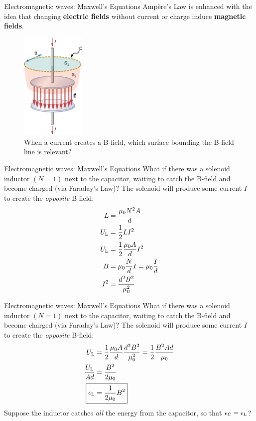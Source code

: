 \documentclass{beamer}
\begin{document}
\begin{frame}{Electromagnetic waves: Maxwell's Equations}
Amp\`{e}re's Law is enhanced with the idea that changing \textbf{electric fields} without current or charge induce \textbf{magnetic fields}.
\begin{figure}
\centering
\includegraphics[width=0.275\textwidth]{figures/displacement_current.png}
\caption{\label{fig:disp_current2} When a current creates a B-field, which surface bounding the B-field line is relevant?}
\end{figure}
\end{frame}

\begin{frame}{Electromagnetic waves: Maxwell's Equations}
What if there was a solenoid inductor $(N = 1)$ next to the capacitor, waiting to catch the B-field and become charged (via Faraday's Law)?  The solenoid will produce some current $I$ to create the \textit{opposite} B-field:
\begin{align}
L &= \frac{\mu_0 N^2 A}{d} \\
U_{\rm L} &= \frac{1}{2} L I^2 \\
U_{\rm L} &= \frac{1}{2} \frac{\mu_0 A}{d} I^2 \\
B &= \mu_0 \frac{N}{d} I = \mu_0 \frac{I}{d} \\
I^2 &= \frac{d^2B^2}{\mu_0^2}
\end{align}
\end{frame}

\begin{frame}{Electromagnetic waves: Maxwell's Equations}
What if there was a solenoid inductor $(N = 1)$ next to the capacitor, waiting to catch the B-field and become charged (via Faraday's Law)?  The solenoid will produce some current $I$ to create the \textit{opposite} B-field:
\begin{align}
U_{\rm L} &= \frac{1}{2}\frac{\mu_0 A}{d}\frac{d^2B^2}{\mu_0^2} = \frac{1}{2}\frac{B^2 Ad}{\mu_0} \\
\frac{U_{\rm L}}{Ad} &= \frac{B^2}{2\mu_0} \\
\Aboxed{\epsilon_{\rm L} &= \frac{1}{2\mu_0} B^2}
\end{align}
Suppose the inductor catches \textit{all} the energy from the capacitor, so that $\epsilon_{\rm C} = \epsilon_{\rm L}$?
\end{frame}
\end{document}
